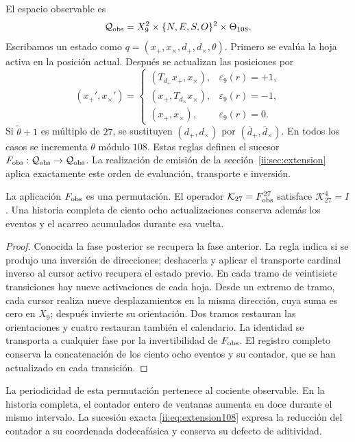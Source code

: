 El espacio observable es
\[
 \mathcal Q_{\rm obs}
 =X_9^2\times\{N,E,S,O\}^2\times\Theta_{108}.
\]
Escribamos un estado como
\(q=(x_+,x_\times,d_+,d_\times,\theta)\). Primero se evalúa la hoja
activa en la posición actual. Después se actualizan las posiciones por
\begin{equation}
 (x_+',x_\times')=
 \begin{cases}
 (T_{d_+}x_+,x_\times),&\varepsilon_9(r)=+1,\\
 (x_+,T_{d_\times}x_\times),&\varepsilon_9(r)=-1,\\
 (x_+,x_\times),&\varepsilon_9(r)=0.
 \end{cases}
 \label{ii:ii:tpk-fobs-posiciones}
\end{equation}
Si \(\widetilde\theta+1\) es múltiplo de \(27\), se sustituyen
\((d_+,d_\times)\) por \((\overline d_+,\overline d_\times)\).
En todos los casos se incrementa \(\theta\) módulo \(108\). Estas reglas
definen el sucesor
\(F_{\rm obs}:\mathcal Q_{\rm obs}\to\mathcal Q_{\rm obs}\).
La realización de emisión de la sección~\ref{ii:sec:extension} aplica
exactamente este orden de evaluación, transporte e inversión.

\begin{proposition}
\label{ii:ii:tpk-retorno-observable}
La aplicación \(F_{\rm obs}\) es una permutación. El operador
\(\mathcal K_{27}=F_{\rm obs}^{27}\) satisface
\(\mathcal K_{27}^{4}=I\). Una historia completa de ciento ocho
actualizaciones conserva además los eventos y el acarreo acumulados
durante esa vuelta.
\end{proposition}
\begin{proof}
Conocida la fase posterior se recupera la fase anterior. La regla indica
si se produjo una inversión de direcciones; deshacerla y aplicar el
transporte cardinal inverso al cursor activo recupera el estado previo.
En cada tramo de veintisiete transiciones hay nueve activaciones de cada
hoja. Desde un extremo de tramo, cada cursor realiza nueve desplazamientos
en la misma dirección, cuya suma es cero en \(X_9\); después invierte
su orientación. Dos tramos restauran las orientaciones y cuatro restauran
también el calendario. La identidad se transporta a cualquier fase por
la invertibilidad de \(F_{\rm obs}\). El registro completo conserva la
concatenación de los ciento ocho eventos y su contador, que se han
actualizado en cada transición.
\end{proof}

La periodicidad de esta permutación pertenece al cociente observable. En
la historia completa, el contador entero de ventanas aumenta en doce
durante el mismo intervalo. La sucesión exacta
\eqref{ii:eq:extension108} expresa la reducción del contador a su coordenada
dodecafásica y conserva su defecto de aditividad.


